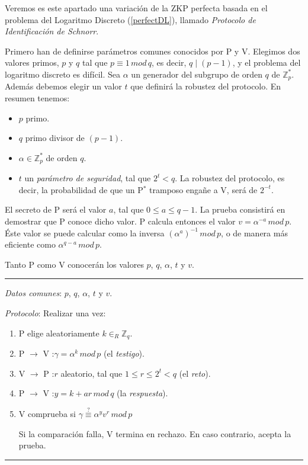 Veremos es este apartado una variación de la ZKP perfecta basada en el problema del Logaritmo Discreto (\ref{perfectDL}), llamado \textit{Protocolo de Identificación de Schnorr}.

\hfil

Primero han de definirse parámetros comunes conocidos por P y V. Elegimos dos valores primos, $p$ y $q$ tal que $p\equiv 1 \, mod \, q$, es decir, $q\mid (p-1)$, y el problema del logaritmo discreto es difícil. Sea $\alpha$ un generador del subgrupo de orden $q$ de $\mathbb{Z}_p^*$. Además debemos elegir un valor $t$ que definirá la robustez del protocolo. En resumen tenemos:

\begin{itemize}
	\item $p$ primo.
	\item $q$ primo divisor de $(p-1)$.
	\item $\alpha \in \mathbb{Z}_p^*$ de orden $q$.
	\item $t$ un \textit{parámetro de seguridad}, tal que $2^t < q$. La robustez del protocolo, es decir, la probabilidad de que un P$^*$ tramposo engañe a V, será de $2^{-t}$.
\end{itemize}


El secreto de P será el valor $a$, tal que $0\leq a \leq q-1$. La prueba consistirá en demostrar que P conoce dicho valor. P calcula entonces el valor $v = \alpha ^{-a} \, mod \, p$. Éste valor se puede calcular como la inversa $\left( \alpha ^{a} \right) ^{-1} \, mod \, p$, o de manera más eficiente como $\alpha ^{q-a} \, mod \, p$.

Tanto P como V conocerán los valores $p$, $q$, $\alpha$, $t$ y $v$.

\rule{\textwidth}{1pt}
\begin{algorithm}[Schnorr]
	
	\hfil
	
	\textit{Datos comunes}: $p$, $q$, $\alpha$, $t$ y $v$.
	
	\textit{Protocolo}: Realizar una vez:
	
	\begin{enumerate}
		
		\item P elige aleatoriamente $k \in_R \mathbb{Z}_q$.
		
		\item P $\rightarrow$ V :\quad $\gamma = \alpha^k \, mod \, p$ (el \textit{testigo}).
		
		\item V $\rightarrow$ P :\quad $r$ aleatorio, tal que $1\leq r\leq 2^t < q $ (el \textit{reto}).
		
		\item P $\rightarrow$ V :\quad $y = k + ar \, mod \, q$ (la \textit{respuesta}).
		
		\item V comprueba si $\gamma \overset{?}{\equiv} \alpha^y v^r \, mod \, p$
		
		Si la comparación falla, V termina en rechazo. En caso contrario, acepta la prueba.
		
		
	\end{enumerate}
	
\end{algorithm}
\rule{\textwidth}{1pt}

